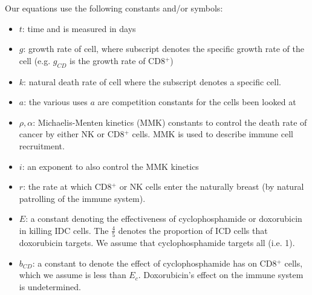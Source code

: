\documentclass[12pt, oneside]{article}   	%
\begin{document}
Our equations use the following constants and/or symbols:
\begin{itemize}
	\item $t$: time and is measured in days
	\item $g$: growth rate of cell, where subscript denotes the specific growth rate of the cell (e.g. $g_{CD}$ is the growth rate of CD8$^+$)
	\item $k$: natural death rate of cell where the subscript denotes a specific cell.
	\item $a$: the various uses  $a$ are competition constants for the cells been looked at
	\item $\rho, \alpha$: Michaelis-Menten kinetics (MMK) constants to control the death rate of cancer by either NK or CD8$^+$ cells. MMK is used to describe immune cell recruitment.
	\item $i$: an exponent to also control the MMK kinetics
	\item $r$: the rate at which CD8$^+$ or NK cells enter the naturally breast (by natural patrolling of the immune system).
	\item $E$: a constant denoting the effectiveness of cyclophosphamide or doxorubicin in killing IDC cells. The $\frac{4}{5}$ denotes the proportion of ICD cells that doxorubicin targets. We assume that cyclophosphamide targets all (i.e. 1).
	\item $b_{CD}$: a constant to denote the effect of cyclophosphamide has on CD8$^+$ cells, which we assume is less than $E_c$. Doxorubicin's effect on the immune system is undetermined.
	
\end{itemize}
\end{document}
